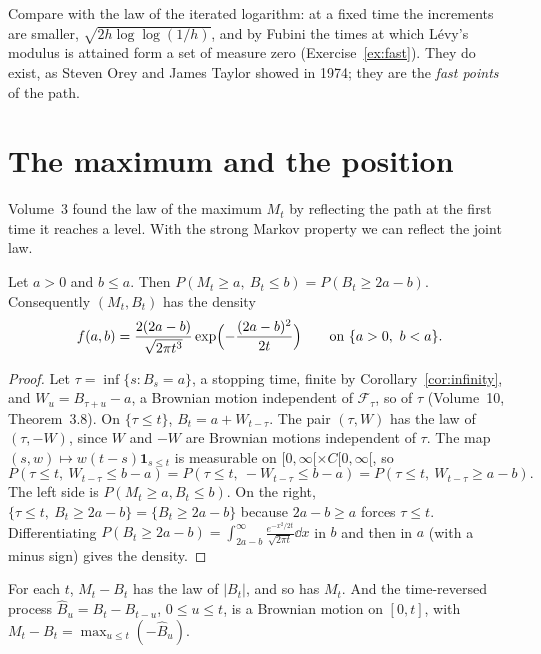 Compare with the law of the iterated logarithm: at a fixed time the increments are smaller, $\sqrt{2h\log\log(1/h)}$, and by Fubini the times at which L\'evy's modulus is attained form a set of
measure zero (Exercise~\ref{ex:fast}). They do exist, as Steven Orey and James Taylor showed in 1974; they are the \emph{fast points} of the path.

\section{The maximum and the position}

Volume~3 found the law of the maximum $M_t$ by reflecting the path at the first time it reaches a level. With the strong Markov property we can reflect the joint law.

\begin{theorem}\label{thm:jointreflection}
Let $a>0$ and $b\le a$. Then $P(M_t\ge a,\ B_t\le b)=P(B_t\ge2a-b)$. Consequently $(M_t,B_t)$ has the density
\[
f(a,b)=\frac{2(2a-b)}{\sqrt{2\pi t^3}}\exp\Bigl(-\frac{(2a-b)^2}{2t}\Bigr)\qquad\text{on }\{a>0,\ b<a\}.
\]
\end{theorem}

\begin{proof}
Let $\tau=\inf\{s:B_s=a\}$, a stopping time, finite by Corollary~\ref{cor:infinity}, and $W_u=B_{\tau+u}-a$, a Brownian motion independent of $\mathcal F_\tau$, so of $\tau$ (Volume~10, Theorem~3.8). On
$\{\tau\le t\}$, $B_t=a+W_{t-\tau}$. The pair $(\tau,W)$ has the law of $(\tau,-W)$, since $W$ and $-W$ are Brownian motions independent of $\tau$. The map $(s,w)\mapsto w(t-s)\mathbf 1_{s\le t}$ is measurable
on $[0,\infty[\times C[0,\infty[$, so
\[
P(\tau\le t,\ W_{t-\tau}\le b-a)=P(\tau\le t,\ -W_{t-\tau}\le b-a)=P(\tau\le t,\ W_{t-\tau}\ge a-b).
\]
The left side is $P(M_t\ge a,B_t\le b)$. On the right, $\{\tau\le t,\ B_t\ge2a-b\}=\{B_t\ge2a-b\}$ because $2a-b\ge a$ forces $\tau\le t$. Differentiating $P(B_t\ge2a-b)=\int_{2a-b}^\infty\frac{e^{-x^2/2t}}{\sqrt{2\pi t}}\dd x$
in $b$ and then in $a$ (with a minus sign) gives the density.
\end{proof}

\begin{corollary}\label{cor:levyfixed}
For each $t$, $M_t-B_t$ has the law of $|B_t|$, and so has $M_t$. And the time-reversed process $\hat B_u=B_t-B_{t-u}$, $0\le u\le t$, is a Brownian motion on $[0,t]$, with $M_t-B_t=\max_{u\le t}(-\hat B_u)$.
\end{corollary}

